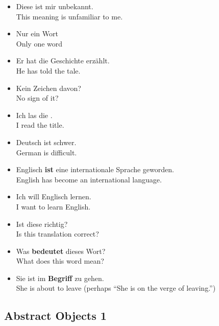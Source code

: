 \begin{itemize}
  \item  Diese  ist mir unbekannt. \\
  This meaning is unfamiliar to me.
  \item  Nur ein Wort \\
  Only one word
  \item  Er hat die Geschichte erz{\"a}hlt. \\
  He has told the tale.
  \item  Kein Zeichen davon? \\
  No sign of it?
  \item  Ich las die . \\
  I read the title.
  \item  Deutsch ist schwer. \\
  German is difficult.
  \item  Englisch \textbf{ist} eine internationale Sprache geworden. \\
  English has become an international language.
  \item  Ich will Englisch lernen. \\
  I want to learn English.
  \item  Ist diese  richtig? \\
  Is this translation correct?
  \item  Was \textbf{bedeutet} dieses Wort? \\
  What does this word mean?
  \item  Sie ist im \textbf{Begriff} zu gehen. \\
  She is about to leave (perhaps ``She is on the verge of leaving.'')
\end{itemize}


\pagebreak
\subsection{Abstract Objects 1}

